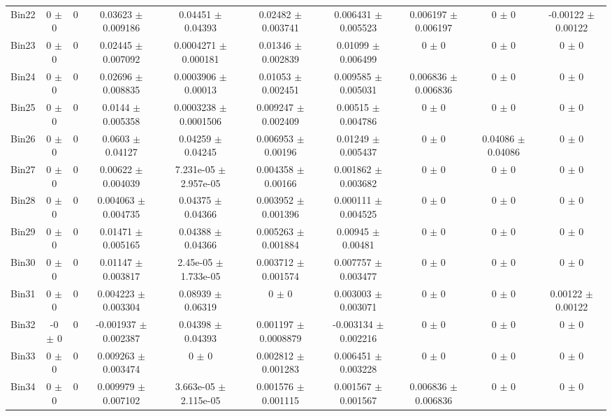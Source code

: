 \begin{tabular}{@{\extracolsep{4pt}}lccccccccc@{}}
     Bin22 & 0 $\pm$ 0 & 0 & 0.03623 $\pm$ 0.009186 & 0.04451 $\pm$ 0.04393 & 0.02482 $\pm$ 0.003741 & 0.006431 $\pm$ 0.005523 & 0.006197 $\pm$ 0.006197 & 0 $\pm$ 0 & -0.00122 $\pm$ 0.00122 \\ 
     Bin23 & 0 $\pm$ 0 & 0 & 0.02445 $\pm$ 0.007092 & 0.0004271 $\pm$ 0.000181 & 0.01346 $\pm$ 0.002839 & 0.01099 $\pm$ 0.006499 & 0 $\pm$ 0 & 0 $\pm$ 0 & 0 $\pm$ 0 \\ 
     Bin24 & 0 $\pm$ 0 & 0 & 0.02696 $\pm$ 0.008835 & 0.0003906 $\pm$ 0.00013 & 0.01053 $\pm$ 0.002451 & 0.009585 $\pm$ 0.005031 & 0.006836 $\pm$ 0.006836 & 0 $\pm$ 0 & 0 $\pm$ 0 \\ 
     Bin25 & 0 $\pm$ 0 & 0 & 0.0144 $\pm$ 0.005358 & 0.0003238 $\pm$ 0.0001506 & 0.009247 $\pm$ 0.002409 & 0.00515 $\pm$ 0.004786 & 0 $\pm$ 0 & 0 $\pm$ 0 & 0 $\pm$ 0 \\ 
     Bin26 & 0 $\pm$ 0 & 0 & 0.0603 $\pm$ 0.04127 & 0.04259 $\pm$ 0.04245 & 0.006953 $\pm$ 0.00196 & 0.01249 $\pm$ 0.005437 & 0 $\pm$ 0 & 0.04086 $\pm$ 0.04086 & 0 $\pm$ 0 \\ 
     Bin27 & 0 $\pm$ 0 & 0 & 0.00622 $\pm$ 0.004039 & 7.231e-05 $\pm$ 2.957e-05 & 0.004358 $\pm$ 0.00166 & 0.001862 $\pm$ 0.003682 & 0 $\pm$ 0 & 0 $\pm$ 0 & 0 $\pm$ 0 \\ 
     Bin28 & 0 $\pm$ 0 & 0 & 0.004063 $\pm$ 0.004735 & 0.04375 $\pm$ 0.04366 & 0.003952 $\pm$ 0.001396 & 0.000111 $\pm$ 0.004525 & 0 $\pm$ 0 & 0 $\pm$ 0 & 0 $\pm$ 0 \\ 
     Bin29 & 0 $\pm$ 0 & 0 & 0.01471 $\pm$ 0.005165 & 0.04388 $\pm$ 0.04366 & 0.005263 $\pm$ 0.001884 & 0.00945 $\pm$ 0.00481 & 0 $\pm$ 0 & 0 $\pm$ 0 & 0 $\pm$ 0 \\ 
     Bin30 & 0 $\pm$ 0 & 0 & 0.01147 $\pm$ 0.003817 & 2.45e-05 $\pm$ 1.733e-05 & 0.003712 $\pm$ 0.001574 & 0.007757 $\pm$ 0.003477 & 0 $\pm$ 0 & 0 $\pm$ 0 & 0 $\pm$ 0 \\ 
     Bin31 & 0 $\pm$ 0 & 0 & 0.004223 $\pm$ 0.003304 & 0.08939 $\pm$ 0.06319 & 0 $\pm$ 0 & 0.003003 $\pm$ 0.003071 & 0 $\pm$ 0 & 0 $\pm$ 0 & 0.00122 $\pm$ 0.00122 \\ 
     Bin32 & -0 $\pm$ 0 & 0 & -0.001937 $\pm$ 0.002387 & 0.04398 $\pm$ 0.04393 & 0.001197 $\pm$ 0.0008879 & -0.003134 $\pm$ 0.002216 & 0 $\pm$ 0 & 0 $\pm$ 0 & 0 $\pm$ 0 \\ 
     Bin33 & 0 $\pm$ 0 & 0 & 0.009263 $\pm$ 0.003474 & 0 $\pm$ 0 & 0.002812 $\pm$ 0.001283 & 0.006451 $\pm$ 0.003228 & 0 $\pm$ 0 & 0 $\pm$ 0 & 0 $\pm$ 0 \\ 
     Bin34 & 0 $\pm$ 0 & 0 & 0.009979 $\pm$ 0.007102 & 3.663e-05 $\pm$ 2.115e-05 & 0.001576 $\pm$ 0.001115 & 0.001567 $\pm$ 0.001567 & 0.006836 $\pm$ 0.006836 & 0 $\pm$ 0 & 0 $\pm$ 0 \\ 

\end{tabular}
